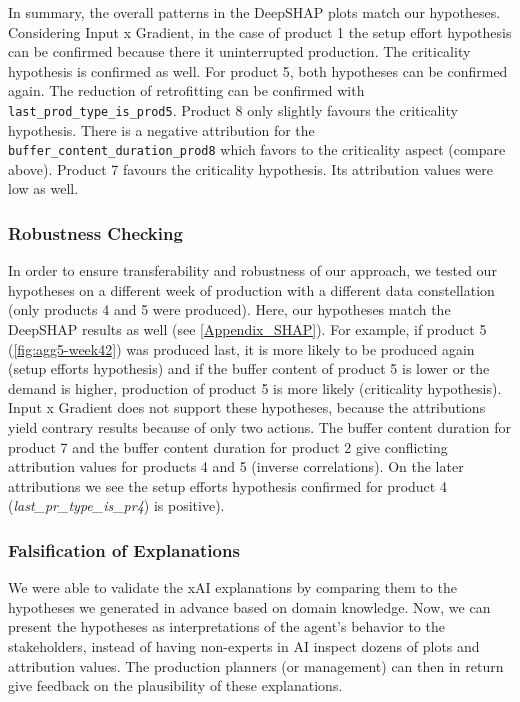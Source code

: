 In summary, the overall patterns in the DeepSHAP plots match our hypotheses. Considering Input x Gradient, in the case of product 1 the setup effort hypothesis can be confirmed because there it uninterrupted production. The criticality hypothesis is confirmed as well.
For product 5, both hypotheses can be confirmed again. The reduction of retrofitting can be confirmed with \texttt{last\_prod\_type\_is\_prod5}.
Product 8 only slightly favours the criticality hypothesis. There is a negative attribution for the \texttt{buffer\_content\_duration\_prod8} which favors to the criticality aspect (compare above). Product 7 favours the criticality hypothesis. Its attribution values were low as well.

\subsubsection{Robustness Checking}
In order to ensure transferability and robustness of our approach, we tested our hypotheses on a different week of production with a different data constellation (only products 4 and 5 were produced). Here, our hypotheses match the DeepSHAP results as well (see \ref{Appendix_SHAP}). For example, if product 5 (\ref{fig:agg5-week42}) was produced last, it is more likely to be produced again (setup efforts hypothesis) and if the buffer content of product 5 is lower or the demand is higher, production of product 5 is more likely (criticality hypothesis).
Input x Gradient does not support these hypotheses, because the attributions yield contrary results because of only two actions. The buffer content duration for product 7 and the buffer content duration for product 2 give conflicting attribution values for products 4 and 5 (inverse correlations). On the later attributions we see the setup efforts hypothesis confirmed for product 4 (\textit{last\_pr\_type\_is\_pr4}) is positive).

\subsubsection{Falsification of Explanations}
We were able to validate the xAI explanations by comparing them to the hypotheses we generated in advance based on domain knowledge. Now, we can present the hypotheses as interpretations of the agent's behavior to the stakeholders, instead of having non-experts in AI inspect dozens of plots and attribution values. The production planners (or management) can then in return give feedback on the plausibility of these explanations.

